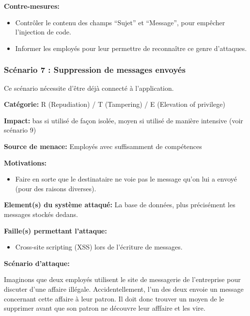 \documentclass{article}
\begin{document}
\textbf{Contre-mesures:}

\begin{itemize}

\item
  Contrôler le contenu des champs ``Sujet'' et ``Message'', pour
  empêcher l'injection de code.
\item
  Informer les employés pour leur permettre de reconnaître ce genre
  d'attaques.
\end{itemize}

\subsubsection{Scénario 7 : Suppression de messages envoyés}

Ce scénario nécessite d'être déjà connecté à l'application.

\textbf{Catégorie:} R (Repudiation) / T (Tampering) / E (Elevation of
privilege)

\textbf{Impact:} bas si utilisé de façon isolée, moyen si utilisé de
manière intensive (voir scénario 9)

\textbf{Source de menace:} Employés avec suffisamment de compétences

\textbf{Motivations:}

\begin{itemize}

\item
  Faire en sorte que le destinataire ne voie pas le message qu'on lui a
  envoyé (pour des raisons diverses).
\end{itemize}

\textbf{Element(s) du système attaqué:} La base de données, plus
précisément les messages stockés dedans.

\textbf{Faille(s) permettant l'attaque:}

\begin{itemize}

\item
  Cross-site scripting (XSS) lors de l'écriture de messages.
\end{itemize}

\textbf{Scénario d'attaque:}

Imaginons que deux employés utilisent le site de messagerie de
l'entreprise pour discuter d'une affaire illégale. Accidentellement,
l'un des deux envoie un message concernant cette affaire à leur patron.
Il doit donc trouver un moyen de le supprimer avant que son patron ne
découvre leur afffaire et les vire.
\end{document}

